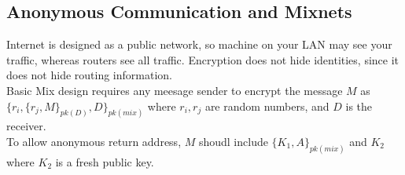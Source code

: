 \documentclass[12pt]{article}
\theoremstyle{definition}
\begin{document}
\subsection{Anonymous Communication and Mixnets}
Internet is designed as a public network, so machine on your LAN may see your traffic, whereas routers see all traffic. Encryption does not hide identities, since it does not hide routing information.\\
Basic Mix design requires any meesage sender to encrypt the message $M$ as
$
\{r_i,\{r_j,M\}_{pk(D)}, D\}_{pk(mix)}
$
where $r_i,r_j$ are random numbers, and $D$ is the receiver.\\
To allow anonymous return address, $M$ shoudl include $\{K_1,A\}_{pk(mix)}$ and $K_2$ where $K_2$ is a fresh public key.
\end{document}
